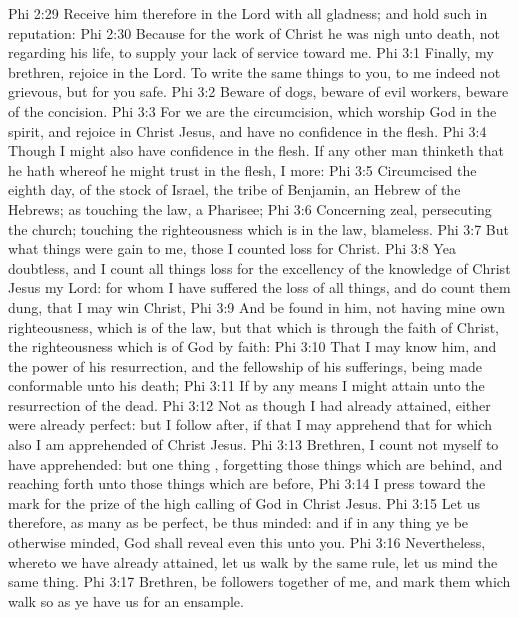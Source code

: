 \vs Phi 2:29 Receive him therefore in the Lord with all gladness; and hold such in reputation:
\vs Phi 2:30 Because for the work of Christ he was nigh unto death, not regarding his life, to supply your lack of service toward me.
\vs Phi 3:1 Finally, my brethren, rejoice in the Lord. To write the same things to you, to me indeed  not grievous, but for you  safe.
\vs Phi 3:2 Beware of dogs, beware of evil workers, beware of the concision.
\vs Phi 3:3 For we are the circumcision, which worship God in the spirit, and rejoice in Christ Jesus, and have no confidence in the flesh.
\vs Phi 3:4 Though I might also have confidence in the flesh. If any other man thinketh that he hath whereof he might trust in the flesh, I more:
\vs Phi 3:5 Circumcised the eighth day, of the stock of Israel,  the tribe of Benjamin, an Hebrew of the Hebrews; as touching the law, a Pharisee;
\vs Phi 3:6 Concerning zeal, persecuting the church; touching the righteousness which is in the law, blameless.
\vs Phi 3:7 But what things were gain to me, those I counted loss for Christ.
\vs Phi 3:8 Yea doubtless, and I count all things  loss for the excellency of the knowledge of Christ Jesus my Lord: for whom I have suffered the loss of all things, and do count them  dung, that I may win Christ,
\vs Phi 3:9 And be found in him, not having mine own righteousness, which is of the law, but that which is through the faith of Christ, the righteousness which is of God by faith:
\vs Phi 3:10 That I may know him, and the power of his resurrection, and the fellowship of his sufferings, being made conformable unto his death;
\vs Phi 3:11 If by any means I might attain unto the resurrection of the dead.
\vs Phi 3:12 Not as though I had already attained, either were already perfect: but I follow after, if that I may apprehend that for which also I am apprehended of Christ Jesus.
\vs Phi 3:13 Brethren, I count not myself to have apprehended: but  one thing , forgetting those things which are behind, and reaching forth unto those things which are before,
\vs Phi 3:14 I press toward the mark for the prize of the high calling of God in Christ Jesus.
\vs Phi 3:15 Let us therefore, as many as be perfect, be thus minded: and if in any thing ye be otherwise minded, God shall reveal even this unto you.
\vs Phi 3:16 Nevertheless, whereto we have already attained, let us walk by the same rule, let us mind the same thing.
\vs Phi 3:17 Brethren, be followers together of me, and mark them which walk so as ye have us for an ensample.
